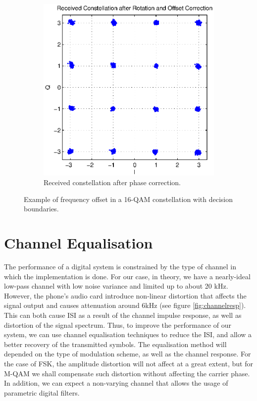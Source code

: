\documentclass[12pt,a4paper,openright]{report}
\begin{document}
\begin{figure}[H]
    \begin{subfigure}{0.32\textwidth}
 \centering
    \includegraphics[width=0.9\linewidth]{rx_const_after.eps}
    \caption{Received constellation after phase correction.}
    \label{fig:PD3}
    \end{subfigure}
    \caption[Example of frequency offset in a 16-QAM constellation]{Example of frequency offset in a 16-QAM constellation with decision boundaries.  }
    \label{fig:phaseoff}
\end{figure}




\section{Channel Equalisation}
\label{sec:chanEQ}
The performance of a digital system is constrained by the type of channel in which the implementation is done. For our case, in theory, we have a nearly-ideal low-pass channel with low noise variance and limited up to about 20 kHz. However, the phone's audio card introduce non-linear distortion that affects the signal output and causes attenuation around 6kHz (see figure \ref{fig:channelresp}). This can both cause ISI as a result of the channel impulse response, as well as distortion of the signal spectrum. Thus, to improve the performance of our system, we can use channel equalisation techniques to reduce the ISI, and allow a better recovery of the transmitted symbols. The equalisation method will depended on the type of modulation scheme, as well as the channel response. For the case of FSK, the amplitude distortion will not affect at a great extent, but for M-QAM we shall compensate such distortion without affecting the carrier phase. In addition, we can expect a non-varying channel that allows the usage of parametric digital filters.  
\end{document}
